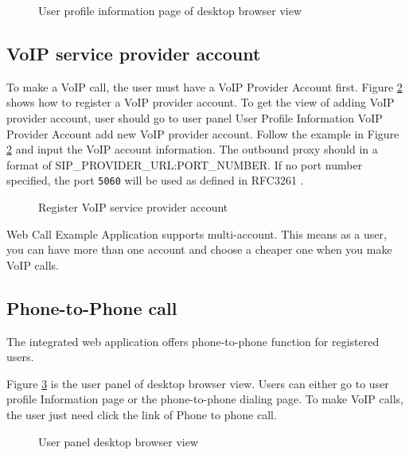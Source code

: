\begin{figure}[!hbtp]
\centering
{}
\caption{User profile information page of desktop browser view}
\label{fig:UserProfileInformationDesktopView}
\end{figure} 

\subsection{VoIP service provider account}
\label{sec:WebApplication:UserAction:VoIPServiceProviderAccount}

To make a VoIP call, the user must have a VoIP Provider Account first. Figure \ref{fig:RegisterVoIPAccount} shows how to register a VoIP provider account. To get the view of adding VoIP provider account, user should go to user panel \textrightarrow{} User Profile Information \textrightarrow{} VoIP Provider Account \textrightarrow{} add new VoIP provider account.
Follow the example in Figure \ref{fig:RegisterVoIPAccount} and input the VoIP account information. The outbound proxy should in a format of SIP\_PROVIDER\_URL:PORT\_NUMBER. If no port number specified, the port \texttt{5060} will be used as defined in RFC3261 \cite{RFC3261}.

\begin{figure}[!hbtp]
\centering
{}
\caption{Register VoIP service provider account}
\label{fig:RegisterVoIPAccount}
\end{figure} 

Web Call Example Application supports multi-account. This means as a user, you can have more than one account and choose a cheaper one when you make VoIP calls.

\subsection{Phone-to-Phone call}
\label{sec:WebApplication:UserAction:Phone2PhoneCall}

The integrated web application offers phone-to-phone function for registered users. 

Figure \ref{fig:UserPanelDesktopBrowserView} is the user panel of desktop browser view. Users can either go to user profile Information page or the phone-to-phone dialing page. To make VoIP calls, the user just need click the link of Phone to phone call.

\begin{figure}[!hbtp]
\centering
{}
\caption{User panel desktop browser view}
\label{fig:UserPanelDesktopBrowserView}
\end{figure} 

